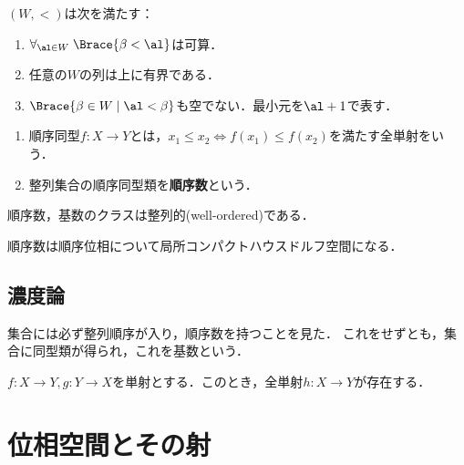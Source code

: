 \documentclass[uplatex,dvipdfmx]{jsreport}
\begin{document}
\begin{proposition}
    $(W,<)$は次を満たす：
    \begin{enumerate}
        \item $\forall_{\al\in W}\;\Brace{\beta<\al}$は可算．
        \item 任意の$W$の列は上に有界である．
        \item $\Brace{\beta\in W\mid\al<\beta}$も空でない．最小元を$\al+1$で表す．
    \end{enumerate}
\end{proposition}

\begin{definition}\mbox{}
    \begin{enumerate}
        \item 順序同型$f:X\to Y$とは，$x_1\le x_2\Leftrightarrow f(x_1)\le f(x_2)$を満たす全単射をいう．
        \item 整列集合の順序同型類を\textbf{順序数}という．
    \end{enumerate}
\end{definition}

\begin{proposition}
    順序数，基数のクラスは整列的(well-ordered)である．
\end{proposition}

\begin{proposition}
    順序数は順序位相について局所コンパクトハウスドルフ空間になる．
\end{proposition}

\section{濃度論}

\begin{tcolorbox}[colframe=ForestGreen, colback=ForestGreen!10!white,breakable,colbacktitle=ForestGreen!40!white,coltitle=black,fonttitle=\bfseries\sffamily,
title=]
    集合には必ず整列順序が入り，順序数を持つことを見た．
    これをせずとも，集合に同型類が得られ，これを基数という．
\end{tcolorbox}

\begin{proposition}[Bernstein, 1897]
    $f:X\to Y,g:Y\to X$を単射とする．このとき，全単射$h:X\to Y$が存在する．
\end{proposition}

\chapter{位相空間とその射}
\end{document}
